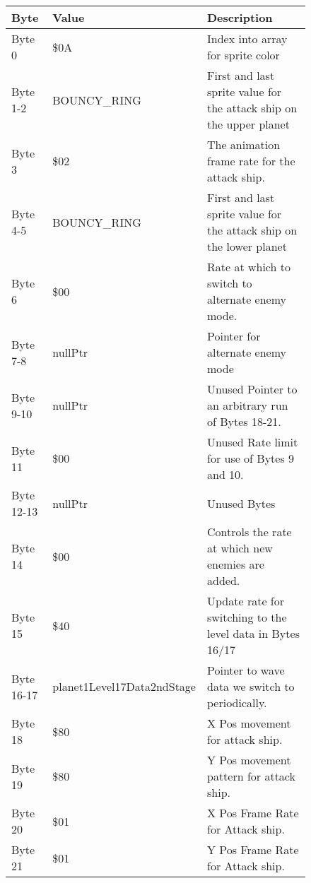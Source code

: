 \begin{figure}[H]
{\begin{adjustbox}{width=12cm}
\begin{tabular}{lll}
\toprule
 Byte       & Value                      & Description                                                         \\
\midrule
 Byte 0     & \$0A                        & Index into array for sprite color                                   \\
 Byte 1-2   & BOUNCY\_RING                & First and last sprite value for the attack ship on the upper planet \\
 Byte 3     & \$02                        & The animation frame rate for the attack ship.                       \\
 Byte 4-5   & BOUNCY\_RING                & First and last sprite value for the attack ship on the lower planet \\
 Byte 6     & \$00                        & Rate at which to switch to alternate enemy mode.                    \\
 Byte 7-8   & nullPtr                    & Pointer for alternate enemy mode                                    \\
 Byte 9-10  & nullPtr                    & Unused Pointer to an arbitrary run of Bytes 18-21.                  \\
 Byte 11    & \$00                        & Unused Rate limit for use of Bytes 9 and 10.                        \\
 Byte 12-13 & nullPtr                    & Unused Bytes                                                        \\
 Byte 14    & \$00                        & Controls the rate at which new enemies are added.                   \\
 Byte 15    & \$40                        & Update rate for switching to the level data in Bytes 16/17          \\
 Byte 16-17 & planet1Level17Data2ndStage & Pointer to wave data we switch to periodically.                     \\
 Byte 18    & \$80                        & X Pos movement for attack ship.                                     \\
 Byte 19    & \$80                        & Y Pos movement pattern for attack ship.                             \\
 Byte 20    & \$01                        & X Pos Frame Rate for Attack ship.                                   \\
 Byte 21    & \$01                        & Y Pos Frame Rate for Attack ship.                                   \\

\end{tabular}
\end{adjustbox}}
\end{figure}
